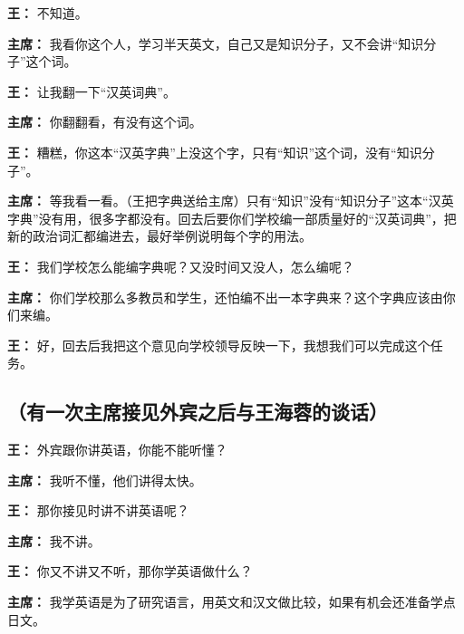 \begin{duihua}
\item[\textbf{王：}] 不知道。

\item[\textbf{主席：}] 我看你这个人，学习半天英文，自己又是知识分子，又不会讲“知识分子”这个词。

\item[\textbf{王：}] 让我翻一下“汉英词典”。

\item[\textbf{主席：}] 你翻翻看，有没有这个词。

\item[\textbf{王：}] 糟糕，你这本“汉英字典”上没这个字，只有“知识”这个词，没有“知识分子”。

\item[\textbf{主席：}] 等我看一看。（王把字典送给主席）只有“知识”没有“知识分子”这本“汉英字典”没有用，很多字都没有。回去后要你们学校编一部质量好的“汉英词典”，把新的政治词汇都编进去，最好举例说明每个字的用法。

\item[\textbf{王：}] 我们学校怎么能编字典呢？又没时间又没人，怎么编呢？

\item[\textbf{主席：}] 你们学校那么多教员和学生，还怕编不出一本字典来？这个字典应该由你们来编。

\item[\textbf{王：}] 好，回去后我把这个意见向学校领导反映一下，我想我们可以完成这个任务。

\end{duihua}

\subsection{（有一次主席接见外宾之后与王海蓉的谈话）}

\begin{duihua}

\item[\textbf{王：}] 外宾跟你讲英语，你能不能听懂？

\item[\textbf{主席：}] 我听不懂，他们讲得太快。

\item[\textbf{王：}] 那你接见时讲不讲英语呢？

\item[\textbf{主席：}] 我不讲。

\item[\textbf{王：}] 你又不讲又不听，那你学英语做什么？

\item[\textbf{主席：}] 我学英语是为了研究语言，用英文和汉文做比较，如果有机会还准备学点日文。
\end{duihua}

